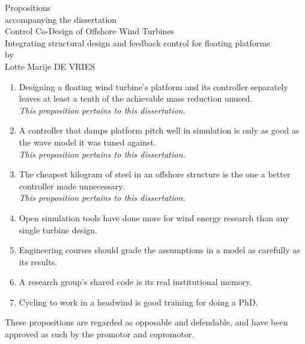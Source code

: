 \documentclass[11pt,a4paper]{article}
\begin{document}
\begin{center}
{\Large Propositions}\\[0.5em]
accompanying the dissertation\\[1em]
{\large Control Co-Design of Offshore Wind Turbines}\\[0.3em]
Integrating structural design and feedback control for floating platforms\\[1em]
by\\[0.5em]
Lotte Marije DE VRIES
\end{center}
\vspace{1em}
\begin{enumerate}
\item Designing a floating wind turbine's platform and its controller separately leaves at least a tenth of the achievable mass reduction unused.\\\emph{This proposition pertains to this dissertation.}
\item A controller that damps platform pitch well in simulation is only as good as the wave model it was tuned against.\\\emph{This proposition pertains to this dissertation.}
\item The cheapest kilogram of steel in an offshore structure is the one a better controller made unnecessary.\\\emph{This proposition pertains to this dissertation.}
\item Open simulation tools have done more for wind energy research than any single turbine design.
\item Engineering courses should grade the assumptions in a model as carefully as its results.
\item A research group's shared code is its real institutional memory.
\item Cycling to work in a headwind is good training for doing a PhD.
\end{enumerate}
\vfill
{\small These propositions are regarded as opposable and defendable, and have been approved as
such by the promotor and copromotor.}
\end{document}
